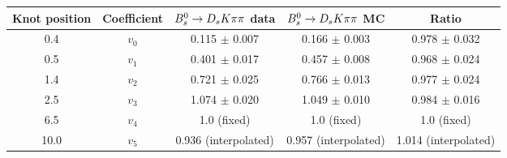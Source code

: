 \begin{tabular}{c c c c c}
\hline
\hline
Knot position & Coefficient & ${{B}^0_{s}}\rightarrow{\ensuremath{{D}_{s}}}{\ensuremath{K}}{\ensuremath{\pi}}{\ensuremath{\pi}}$ data & ${{B}^0_{s}}\rightarrow{\ensuremath{{D}_{s}}}{\ensuremath{K}}{\ensuremath{\pi}}{\ensuremath{\pi}}$ MC & Ratio \\
\hline
0.4 & $v_{0}$ & 0.115 $\pm$ 0.007 & 0.166 $\pm$ 0.003 & 0.978 $\pm$ 0.032\\
0.5 & $v_{1}$ & 0.401 $\pm$ 0.017 & 0.457 $\pm$ 0.008 & 0.968 $\pm$ 0.024\\
1.4 & $v_{2}$ & 0.721 $\pm$ 0.025 & 0.766 $\pm$ 0.013 & 0.977 $\pm$ 0.024\\
2.5 & $v_{3}$ & 1.074 $\pm$ 0.020 & 1.049 $\pm$ 0.010 & 0.984 $\pm$ 0.016\\
6.5 & $v_{4}$ &  1.0 (fixed) & 1.0 (fixed) & 1.0 (fixed)\\
10.0 & $v_{5}$ & 0.936 (interpolated) & 0.957 (interpolated) & 1.014 (interpolated) \\
\hline
\hline
\end{tabular}
